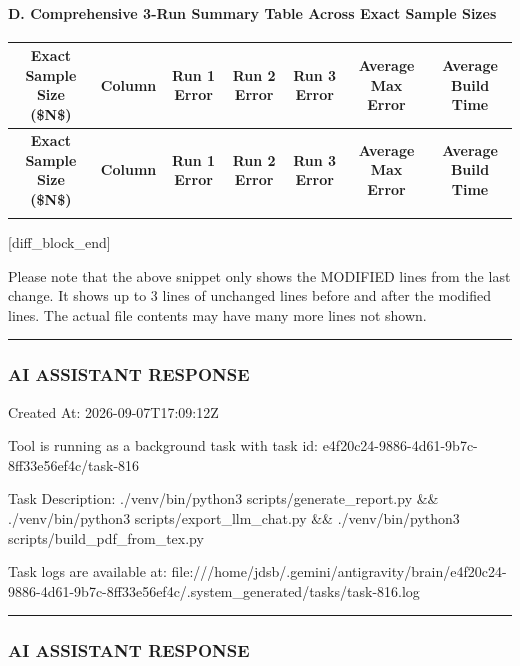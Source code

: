 \documentclass[11pt,a4paper]{article}
\begin{document}
\paragraph{D. Comprehensive 3-Run Summary Table Across Exact Sample Sizes}
{\begingroup
\footnotesize
\setlength{\tabcolsep}{3.5pt}
\begin{xltabular}{\textwidth}{C | C | C | C | C | C | C}
\toprule
\textbf{Exact Sample Size (\$N\$)} & \textbf{Column} & \textbf{Run 1 Error} & \textbf{Run 2 Error} & \textbf{Run 3 Error} & \textbf{\textbf{Average Max Error}} & \textbf{Average Build Time} \\
\midrule
\endfirsthead
\toprule
\textbf{Exact Sample Size (\$N\$)} & \textbf{Column} & \textbf{Run 1 Error} & \textbf{Run 2 Error} & \textbf{Run 3 Error} & \textbf{\textbf{Average Max Error}} & \textbf{Average Build Time} \\
\midrule
\endfirsthead
\endhead
\bottomrule
\endfoot
\bottomrule
\endlastfoot
\end{xltabular}
\endgroup}

[diff\_block\_end]


Please note that the above snippet only shows the MODIFIED lines from the last change. It shows up to 3 lines of unchanged lines before and after the modified lines. The actual file contents may have many more lines not shown.


\hrule

\subsubsection{AI ASSISTANT RESPONSE}

Created At: 2026-09-07T17:09:12Z

Tool is running as a background task with task id: e4f20c24-9886-4d61-9b7c-8ff33e56ef4c/task-816

Task Description: ./venv/bin/python3 scripts/generate\_report.py \&\& ./venv/bin/python3 scripts/export\_llm\_chat.py \&\& ./venv/bin/python3 scripts/build\_pdf\_from\_tex.py

Task logs are available at: file:///home/jdsb/.gemini/antigravity/brain/e4f20c24-9886-4d61-9b7c-8ff33e56ef4c/.system\_generated/tasks/task-816.log


\hrule

\subsubsection{AI ASSISTANT RESPONSE}
\end{document}
